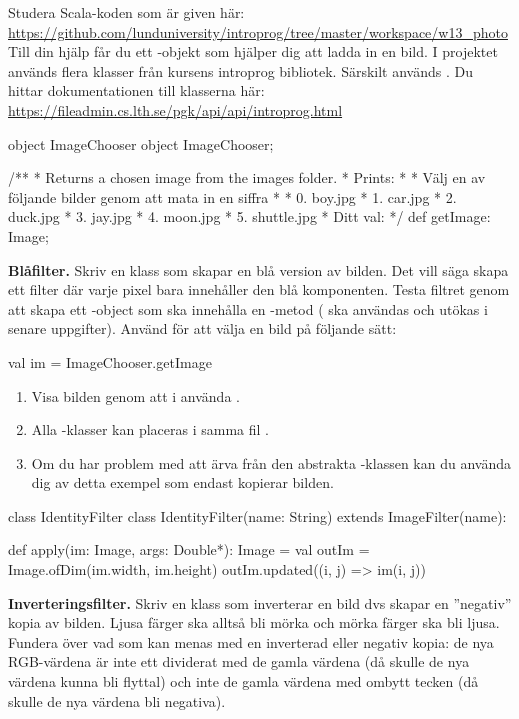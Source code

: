 Studera Scala-koden som är given här: \url{https://github.com/lunduniversity/introprog/tree/master/workspace/w13_photo}
Till din hjälp får du ett -objekt som hjälper dig att ladda in en bild. 
I projektet används flera klasser från kursens introprog bibliotek. Särskilt används .
Du hittar dokumentationen till klasserna här: \url{https://fileadmin.cs.lth.se/pgk/api/api/introprog.html}

\begin{ScalaSpec}{object ImageChooser}
	object ImageChooser;
	
	/**
	* Returns a chosen image from the images folder.
	* Prints:	
	*
	*	Välj en av följande bilder genom att mata in en siffra
	*
	*	0. boy.jpg
	*	1. car.jpg
	*	2. duck.jpg
	*	3. jay.jpg
	*	4. moon.jpg
	*	5. shuttle.jpg
	*	Ditt val: 
	*/
	def getImage: Image;
\end{ScalaSpec}


\Task \textbf{Blåfilter.} Skriv en klass  som skapar en blå version av bilden. 
Det vill säga skapa ett filter där varje pixel bara innehåller den blå komponenten. 
Testa filtret genom att skapa ett -object som ska innehålla en 
-metod ( ska användas och utökas i senare uppgifter). 
Använd  för att välja en bild på följande sätt:
\begin{Code}
	val im = ImageChooser.getImage
\end{Code}
\begin{enumerate}
	\item Visa bilden genom att i  använda . 
	\item Alla -klasser kan placeras i samma fil .
	\item Om du har problem med att ärva från den abstrakta -klassen kan du använda dig av detta exempel som endast kopierar bilden.
\end{enumerate}
\begin{ScalaSpec}{class IdentityFilter}
	class IdentityFilter(name: String) extends ImageFilter(name):
	
	  def apply(im: Image, args: Double*): Image = 
		val outIm = Image.ofDim(im.width, im.height)
		outIm.updated((i, j) => im(i, j))
	\end{ScalaSpec}



\Task \textbf{Inverteringsfilter.} Skriv en klass  som inverterar en bild dvs skapar en ''negativ'' kopia av bilden. Ljusa färger ska alltså bli mörka och mörka färger ska bli ljusa.
Fundera över vad som kan menas med en inverterad eller negativ kopia: de nya RGB-värdena är inte ett dividerat med de gamla värdena (då skulle de nya värdena kunna bli flyttal) och inte de gamla värdena med ombytt tecken (då skulle de nya värdena bli negativa).

